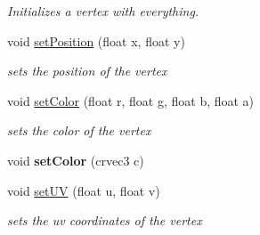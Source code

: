 \begin{DoxyCompactItemize}
\begin{DoxyCompactList}\small\item\em Initializes a vertex with everything. \end{DoxyCompactList}\item 
\mbox{\label{structnta_1_1Vertex2D_a7079a91fd386eb3e4425c965f2ce2592}} 
void \hyperlink{structnta_1_1Vertex2D_a7079a91fd386eb3e4425c965f2ce2592}{set\+Position} (float x, float y)
\begin{DoxyCompactList}\small\item\em sets the position of the vertex \end{DoxyCompactList}\item 
\mbox{\label{structnta_1_1Vertex2D_a12483720589a9836dd4628b2c2bc480c}} 
void \hyperlink{structnta_1_1Vertex2D_a12483720589a9836dd4628b2c2bc480c}{set\+Color} (float r, float g, float b, float a)
\begin{DoxyCompactList}\small\item\em sets the color of the vertex \end{DoxyCompactList}\item 
\mbox{\label{structnta_1_1Vertex2D_a353285f6dc33e239b6c1290f50db1a3a}} 
void {\bfseries set\+Color} (crvec3 c)
\item 
\mbox{\label{structnta_1_1Vertex2D_adb7b7e6498200e6f11965b0ecadeaa97}} 
void \hyperlink{structnta_1_1Vertex2D_adb7b7e6498200e6f11965b0ecadeaa97}{set\+UV} (float u, float v)
\begin{DoxyCompactList}\small\item\em sets the uv coordinates of the vertex \end{DoxyCompactList}\end{DoxyCompactItemize}
